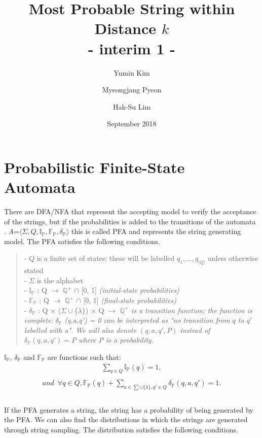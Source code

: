 \documentclass{article}
\title{Most Probable String within Distance $k$\\ - interim 1 -}
\author{Yumin Kim\and Myeongjang Pyeon\and Hak-Su Lim}
\date{September 2018}
\theoremstyle{plain}
\theoremstyle{definition}
\theoremstyle{remark}
\begin{document}
\maketitle



\section{Probabilistic Finite-State Automata}
There are DFA/NFA that represent the accepting model to verify the acceptance of the strings, but if the probabilities is added to the transitions of the automata \cite{vidal2005probabilistic, vidal2005probabilistic2}. 
\textit{A}=$\langle\Sigma,Q,\mathbb{I_P},\mathbb{F_P},\delta_\mathbb{P}\rangle$ this is called PFA and represents the string generating model. The PFA satisfies the following conditions.\\
\begin{quotation}
\noindent
- $Q$ is a finite set of states; these will be labelled $q_1,\dots, q_{|Q|}$ unless otherwise stated\\
- $\Sigma$ is the alphabet\\
- $\mathbb{I_P}$ : Q $\rightarrow$ $\mathbb{Q^+}$ $\cap$ [0, 1] \textit{(initial-state probabilities)}\\
- $\mathbb{F_P}$ : Q $\rightarrow$ $\mathbb{Q^+}$ $\cap$ [0, 1] \textit{(final-state probabilities)}\\
- $\delta_\mathbb{P}$ : Q $\times$ ($\Sigma \cup \{\lambda\}$) $\times$ Q $\rightarrow$ $\mathbb{Q^+}$ \textit{is a transition function; the function is complete:} $\delta_\mathbb{P}$ \textit{(q,a,q') = 0 can be interpreted as "no transition from $q$ to $q'$ labelled with a". We will also denote $(q,a,q',P)$ instead of $\delta_\mathbb{P}(q,a,q') = P$ where P is a probability.}\\ 
\end{quotation}
$\mathbb{I_P}$, $\mathbb{\delta_P}$ and $\mathbb{F_P}$ are functions such that:\\
\begin{align*}
\sum_{q\in\textit{Q}}\mathbb{I_P}(q) = 1, \\
\end{align*}
\begin{align*}
and \enspace\forall q \in \textit{Q}, \mathbb{F_P}(q)+\sum_{a\in\sum\cup\{\lambda\}, q'\in\textit{Q}}\delta_\mathbb{P}(q,a,q') = 1.\\
\end{align*}
\\If the PFA generates a string, the string has a probability of being generated by the PFA. We can also find the distributions in which the strings are generated through string sampling. The distribution satisfies the following conditions.\\
\end{document}
